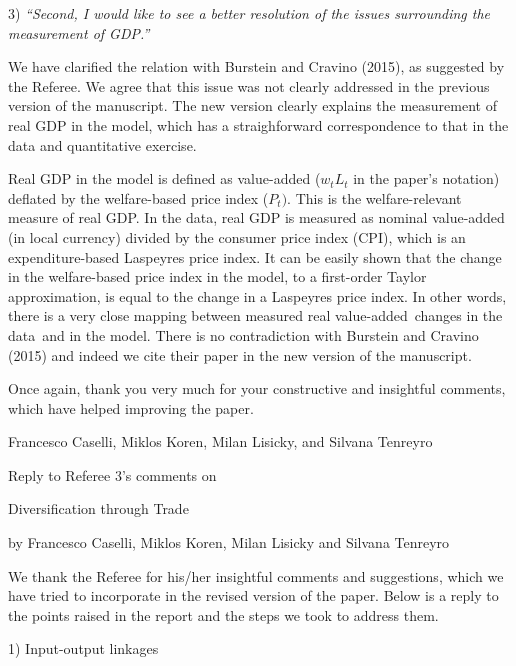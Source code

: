 \documentclass[12pt]{article}
\begin{document}
3) \textit{\textquotedblleft Second, I would like to see a better resolution
of the issues surrounding the measurement of GDP.\textquotedblright }

We have clarified the relation with Burstein and Cravino (2015), as
suggested by the Referee. We agree that this issue was not clearly addressed
in the previous version of the manuscript. The new version clearly explains
the measurement of real GDP in the model, which has a straighforward
correspondence to that in the data and quantitative exercise.

Real GDP in the model is defined as value-added ($w_{t}L_{t}$ in the paper's
notation) deflated by the welfare-based price index ($P_{t})$. This is the
welfare-relevant measure of real GDP. In the data, real GDP is measured as
nominal value-added (in local currency) divided by the consumer price index
(CPI), which is an expenditure-based Laspeyres price index. It can be easily
shown that the change in the welfare-based price index in the model, to a
first-order Taylor approximation, is equal to the change in a Laspeyres
price index. In other words, there is a very close mapping between measured
real value-added\ changes in the data\ and in the model. There is no
contradiction with Burstein and Cravino (2015) and indeed we cite their
paper in the new version of the manuscript.\bigskip

Once again, thank you very much for your constructive and insightful
comments, which have helped improving the paper.\medskip \medskip \bigskip

Francesco Caselli, Miklos Koren, Milan Lisicky, and Silvana
Tenreyro\pagebreak

\begin{center}
\thispagestyle{plain}\setcounter{page}{1}

Reply to Referee 3's comments on

{\Large Diversification through Trade}

by Francesco Caselli, Miklos Koren, Milan Lisicky and Silvana
Tenreyro\medskip \medskip \bigskip
\end{center}

We thank the Referee for his/her insightful comments and suggestions, which
we have tried to incorporate in the revised version of the paper. Below is a
reply to the points raised in the report and the steps we took to address
them.

\bigskip

1) Input-output linkages
\end{document}
